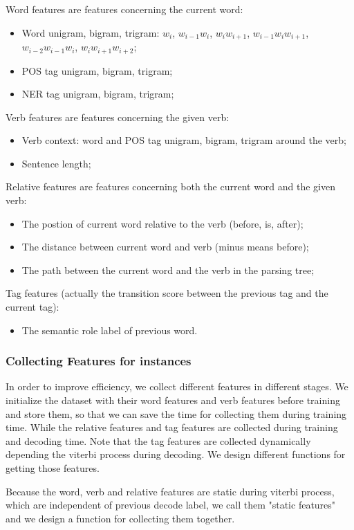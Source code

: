 \documentclass[11pt,a4paper]{article}
\begin{document}
Word features are features concerning the current word:
\begin{itemize}
  \item Word unigram, bigram, trigram: $w_i$, $w_{i-1}w_i$, $w_i w_{i+1}$, 
  $w_{i-1}w_i w_{i+1}$, $w_{i-2}w_{i-1}w_i$, $w_i w_{i+1}w_{i+2}$;
  \item POS tag unigram, bigram, trigram;
  \item NER tag unigram, bigram, trigram;
\end{itemize}
Verb features are features concerning the given verb:
\begin{itemize}
  \item Verb context: word and POS tag unigram, bigram, trigram around the verb;
  \item Sentence length;
\end{itemize}
Relative features are features concerning both the current word and the given verb:
\begin{itemize}
  \item The postion of current word relative to the verb (before, is, after);\cite{hacioglu2004semantic}
  \item The distance between current word and verb (minus means before);
  \item The path between the current word and the verb in the parsing tree\cite{xue2004calibrating};
\end{itemize}
Tag features (actually the transition score between the previous tag and the current tag):
\begin{itemize}
  \item The semantic role label of previous word.
\end{itemize}

\subsubsection{Collecting Features for instances}
In order to improve efficiency, we collect different features in different stages.
We initialize the dataset with their word features and verb features before training
and store them, so that we can save the time for collecting them during training time. 
While the relative features and tag features are collected during training and decoding time.
Note that the tag features are collected dynamically depending the viterbi process during decoding.
We design different functions for getting those features.

Because the word, verb and relative features are static during viterbi process, which are 
independent of previous decode label, we call them "static features" and we design a function 
for collecting them together.
\end{document}
